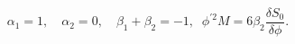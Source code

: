 \begin{equation*}
\alpha _{1}=1,\quad \alpha _{2}=0,\quad \beta _{1}+\beta _{2}=-1,\;\;\phi
^{\prime 2}M=6\beta _{2}\frac{\delta S_{0}}{\delta \phi }.
\end{equation*}

